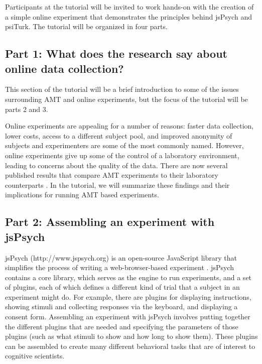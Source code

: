 \documentclass[10pt,letterpaper]{article}
\begin{document}
Participants at the tutorial will be invited to work hands-on with the creation of a simple online experiment that demonstrates the principles behind jsPsych and psiTurk. The tutorial will be organized in four parts.

\subsection{Part 1: What does the research say about online data collection?}

This section of the tutorial will be a brief introduction to some of the issues surrounding AMT and online experiments, but the focus of the tutorial will be parts 2 and 3.

Online experiments are appealing for a number of reasons: faster data collection, lower costs, access to a different subject pool, and improved anonymity of subjects and experimenters are some of the most commonly named. However, online experiments give up some of the control of a laboratory environment, leading to concerns about the quality of the data. There are now several published results that compare AMT experiments to their laboratory counterparts \cite{paolacci2010running, buhrmester2011amazon, zwann2012revisiting, crump2013evaluating, goodman2013data}. In the tutorial, we will summarize these findings and their implications for running AMT based experiments. 
  
\subsection{Part 2: Assembling an experiment with jsPsych}

jsPsych (http://www.jspsych.org) is an open-source JavaScript library that simplifies the process of writing a web-browser-based experiment \cite{deleeuw2014jspsych}. jsPsych contains a core library, which serves as the engine to run experiments, and a set of plugins, each of which defines a different kind of trial that a subject in an experiment might do. For example, there are plugins for displaying instructions, showing stimuli and collecting responses via the keyboard, and displaying a consent form. Assembling an experiment with jsPsych involves putting together the different plugins that are needed and specifying the parameters of those plugins (such as what stimuli to show and how long to show them). These plugins can be assembled to create many different behavioral tasks that are of interest to cognitive scientists.
\end{document}
